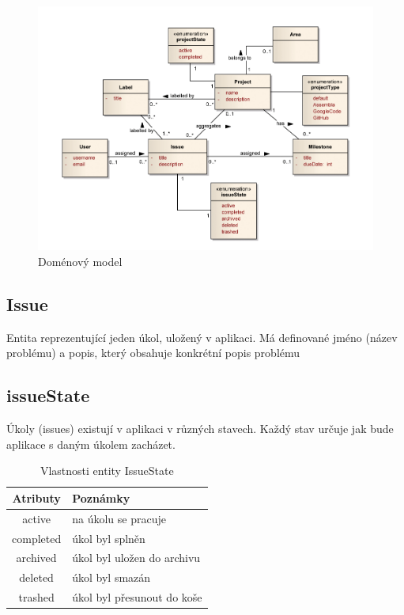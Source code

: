 \begin{figure}[h]
	\includegraphics[keepaspectratio,width=16cm]{figures/domain-model}
	\caption{Doménový model}
	\label{fig:domain-model}
\end{figure}

\subsection{Issue}
Entita reprezentující jeden úkol, uložený v aplikaci. Má definované jméno (název problému) a popis, který obsahuje konkrétní popis problému

\subsection{issueState}
Úkoly (issues) existují v aplikaci v různých stavech. Každý stav určuje jak bude aplikace s daným úkolem zacházet.

\begin{table}
\begin{center}
	\begin{tabular}{|c|l|}
	\hline
	Atributy & Poznámky \\
	\hline
	active & na úkolu se pracuje \\
	completed & úkol byl splněn \\
	archived & úkol byl uložen do archivu \\
	deleted & úkol byl smazán \\
	trashed & úkol byl přesunout do koše \\
	\hline
	\end{tabular}
\end{center}
\caption{Vlastnosti entity IssueState}
\label{tab:issueState}
\end{table}

